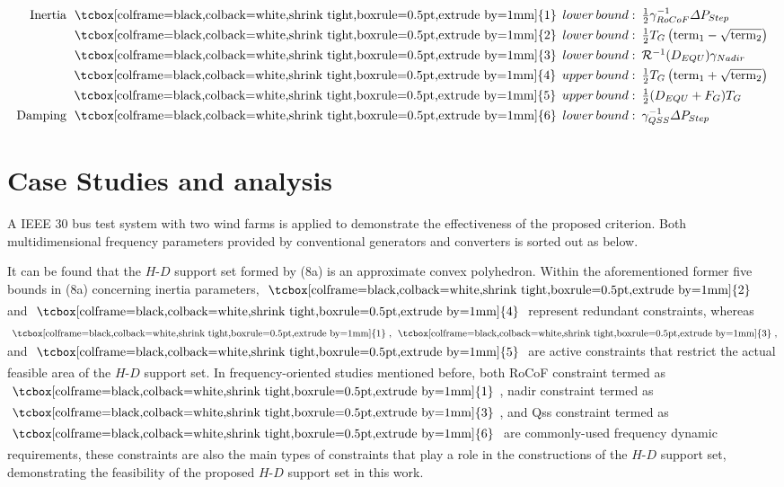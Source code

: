 \documentclass[lettersize,journal]{IEEEtran}
\newcommand{\ciao}[1]{{\setlength\fboxrule{0pt}\fbox{\tcbox[colframe=black,colback=white,shrink tight,boxrule=0.5pt,extrude by=1mm]{\small #1}}}}
\begin{document}
\begin{subequations}
  \begin{align}
    \!\!\!\begin{array}{rl}
    \text{Inertia}\,\, \ciao{1}\, lower\,bound:&\!\!\!\frac{1}{2} \gamma_{RoCoF}^{-1} \varDelta P_{Step}\\
    \ciao{2}\,lower\,bound:&\!\!\!\frac{1}{2}T_G \left(\text{term}_1 - \sqrt{\text{term}_2} \right)\\
    \ciao{3}\,lower\,bound:&\!\!\!\mathcal{R}^{-1}(D_{EQU}) \gamma_{Nadir} \\
    \ciao{4}\,upper\,bound:&\!\!\!\frac{1}{2}T_G \left(\text{term}_1 + \sqrt{\text{term}_2} \right)\\
    \ciao{5}\,upper\,bound:&\!\!\! \frac{1}{2}(D_{EQU} + F_G) T_G\\    
   \text{ Damping} \,\,\ciao{6}\,lower\,bound:&\!\!\! \gamma_{QSS}^{-1} \varDelta P_{Step}\\ 
    \end{array}
  \end{align}
\end{subequations}

\section{Case Studies and analysis}

A IEEE $30$ bus test system with two wind farms is applied to demonstrate the effectiveness of the proposed criterion. Both multidimensional frequency parameters provided by conventional generators and converters is sorted out as below. 

It can be found that the $H$-$D$ support set formed by (8a) is an approximate convex polyhedron. Within the aforementioned former five bounds in (8a) concerning inertia parameters, $\ciao{2}$ and $\ciao{4}$ represent redundant constraints, whereas $\ciao{1},\,\ciao{3},$ and $\ciao{5}$ are active constraints that restrict the actual feasible area of the $H$-$D$ support set.
In frequency-oriented studies mentioned before, both RoCoF constraint termed as $\ciao{1}$, nadir constraint termed as $\ciao{3}$, and Qss constraint termed as $\ciao{6}$ are commonly-used frequency dynamic requirements, these constraints are also the main types of constraints that play a role in the constructions of the $H$-$D$ support set, demonstrating the feasibility of the proposed $H$-$D$ support set in this work. 
\end{document}
